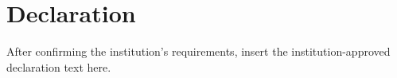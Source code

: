 \chapter*{Declaration}
After confirming the institution's requirements, insert the institution-approved declaration text here.
